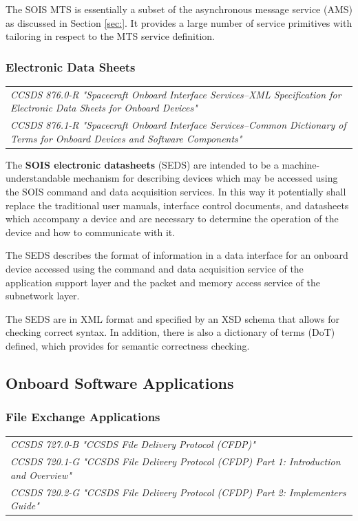 The SOIS MTS is essentially a subset of the asynchronous message service (AMS) as discussed in Section \ref{sec:}. It provides a large number of service primitives with tailoring in respect to the MTS service definition.

\subsubsection{Electronic Data Sheets}

\begin{tabular}{l}
\textit{CCSDS 876.0-R "Spacecraft Onboard Interface Services--XML Specification for Electronic Data Sheets for Onboard Devices" \cite{}} \\
\textit{CCSDS 876.1-R "Spacecraft Onboard Interface Services--Common Dictionary of Terms for Onboard Devices and Software Components" \cite{}}
\end{tabular}

The \textbf{SOIS electronic datasheets} (SEDS) are intended to be a machine-understandable mechanism for describing devices which may be accessed using the SOIS command and data acquisition services. In this way it potentially shall replace the traditional user manuals, interface control documents, and datasheets which accompany a device and are necessary to determine the operation of the device and how to communicate with it.

The SEDS describes the format of information in a data interface for an onboard device accessed using the command and data acquisition service of the application support layer and the packet and memory access service of the subnetwork layer.

The SEDS are in XML format and specified by an XSD schema that allows for checking correct syntax. In addition, there is also a dictionary of terms (DoT) defined, which provides for semantic correctness checking. 

\subsection{Onboard Software Applications}
\label{sec:Onboard Software Applications}

\subsubsection{File Exchange Applications}

\begin{tabular}{l}
\textit{CCSDS 727.0-B "CCSDS File Delivery Protocol (CFDP)" \cite{CCSDS 727.0-B}} \\
\textit{CCSDS 720.1-G "CCSDS File Delivery Protocol (CFDP) Part 1: Introduction and Overview" \cite{CCSDS 727.1-B}} \\
\textit{CCSDS 720.2-G "CCSDS File Delivery Protocol (CFDP) Part 2: Implementers Guide" \cite{CCSDS 727.2-B}} \\
\end{tabular}

